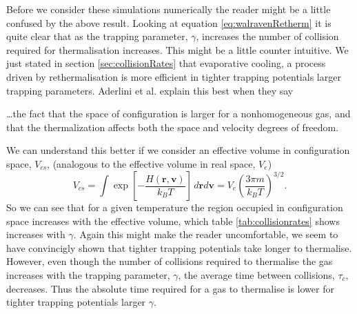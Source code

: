 Before we consider these simulations numerically the reader might be a little confused by the above result. 
Looking at equation \ref{eq:walravenRetherm} it is quite clear that as the trapping parameter, $\gamma$, increases the number of collision required for thermalisation increases.
This might be a little counter intuitive.
We just stated in section \ref{sec:collisionRates} that evaporative cooling, a process driven by rethermalisation is more efficient in tighter trapping potentials \ie larger trapping parameters.
Aderlini et al. explain this best when they say
\begin{displayquote}
    \dots the fact that the space of configuration is larger for a nonhomogeneous gas, and that the thermalization affects both the space and velocity degrees of freedom.
\end{displayquote}
We can understand this better if we consider an effective volume in configuration space, $V_{cs}$, (analogous to the effective volume in real space, $V_{e}$)
\begin{equation}
    V_{cs} = \int \exp\left[ -\frac{H( \mathbf{r}, \mathbf{v})}{k_B T}\right]\,d\mathbf{r}d\mathbf{v} = V_e \left(\frac{3\pi m}{k_B T}\right)^{3/2}.
\end{equation}
So we can see that for a given temperature the region occupied in configuration space increases with the effective volume, which table \ref{tab:collisionrates} shows increases with $\gamma$.
Again this might make the reader uncomfortable, we seem to have convincigly shown that tighter trapping potentials take longer to thermalise. 
However, even though the number of collisions required to thermalise the gas increases with the trapping parameter, $\gamma$, the average time between collisions, $\tau_c$, decreases.
Thus the absolute time required for a gas to thermalise is lower for tighter trapping potentials \ie larger $\gamma$.

